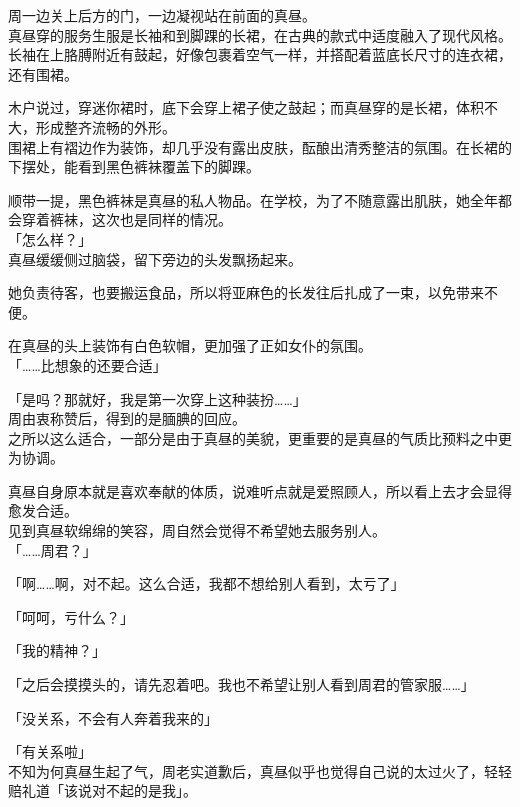 周一边关上后方的门，一边凝视站在前面的真昼。\\

真昼穿的服务生服是长袖和到脚踝的长裙，在古典的款式中适度融入了现代风格。长袖在上胳膊附近有鼓起，好像包裹着空气一样，并搭配着蓝底长尺寸的连衣裙，还有围裙。

木户说过，穿迷你裙时，底下会穿上裙子使之鼓起；而真昼穿的是长裙，体积不大，形成整齐流畅的外形。\\

围裙上有褶边作为装饰，却几乎没有露出皮肤，酝酿出清秀整洁的氛围。在长裙的下摆处，能看到黑色裤袜覆盖下的脚踝。

顺带一提，黑色裤袜是真昼的私人物品。在学校，为了不随意露出肌肤，她全年都会穿着裤袜，这次也是同样的情况。\\

「怎么样？」\\

真昼缓缓侧过脑袋，留下旁边的头发飘扬起来。

她负责待客，也要搬运食品，所以将亚麻色的长发往后扎成了一束，以免带来不便。

在真昼的头上装饰有白色软帽，更加强了正如女仆的氛围。\\

「……比想象的还要合适」

「是吗？那就好，我是第一次穿上这种装扮……」\\

周由衷称赞后，得到的是腼腆的回应。\\

之所以这么适合，一部分是由于真昼的美貌，更重要的是真昼的气质比预料之中更为协调。

真昼自身原本就是喜欢奉献的体质，说难听点就是爱照顾人，所以看上去才会显得愈发合适。\\

见到真昼软绵绵的笑容，周自然会觉得不希望她去服务别人。\\

「……周君？」

「啊……啊，对不起。这么合适，我都不想给别人看到，太亏了」

「呵呵，亏什么？」

「我的精神？」

「之后会摸摸头的，请先忍着吧。我也不希望让别人看到周君的管家服……」

「没关系，不会有人奔着我来的」

「有关系啦」\\

不知为何真昼生起了气，周老实道歉后，真昼似乎也觉得自己说的太过火了，轻轻赔礼道「该说对不起的是我」。\\

